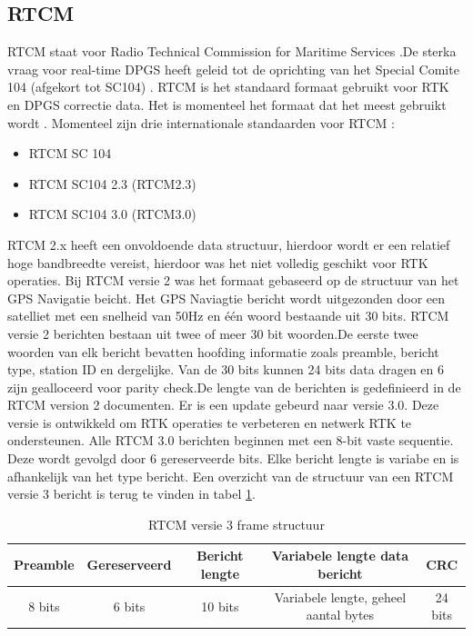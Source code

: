 \subsection{RTCM}
\label{LRTC}
RTCM staat voor Radio Technical Commission for Maritime Services \cite{LBibGLONASS}.De sterka vraag voor real-time DPGS heeft geleid tot de oprichting van het Special Comite 104 (afgekort tot SC104) \cite{LBibRTCM}. RTCM is het standaard formaat gebruikt voor RTK en DPGS correctie data. Het is momenteel het formaat dat het meest gebruikt wordt \cite{LBibRTK3}.
Momenteel zijn drie internationale standaarden voor RTCM \cite{LBibRTCM}:
\begin{itemize}
	\item RTCM SC 104
	\item RTCM SC104 2.3 (RTCM2.3)
	\item RTCM SC104 3.0 (RTCM3.0) 
\end{itemize}
RTCM 2.x heeft een onvoldoende data structuur, hierdoor wordt er een relatief hoge bandbreedte vereist, hierdoor was het niet volledig geschikt voor RTK operaties. Bij RTCM versie 2 was het formaat gebaseerd op de structuur van het GPS Navigatie beicht. Het GPS Naviagtie bericht wordt uitgezonden door een satelliet met een snelheid van 50Hz en \'e\'en woord bestaande uit 30 bits. RTCM versie 2 berichten bestaan uit twee of meer 30 bit woorden.De eerste twee woorden van elk bericht bevatten hoofding informatie zoals preamble, bericht type, station ID en dergelijke. Van de 30 bits kunnen 24 bits data dragen en 6 zijn gealloceerd voor parity check.De lengte van de berichten is gedefinieerd in de RTCM version 2 documenten. Er is een update gebeurd naar versie 3.0. Deze versie is ontwikkeld om RTK operaties te verbeteren en netwerk RTK te ondersteunen. Alle RTCM 3.0 berichten beginnen met een 8-bit vaste sequentie. Deze wordt gevolgd door 6 gereserveerde bits. Elke bericht lengte is variabe en is afhankelijk van het type bericht. Een overzicht van de structuur van een RTCM versie 3 bericht is terug te vinden in tabel \ref{TabRTCM}.

\begin{table}[hbp]
	\caption{RTCM versie 3 frame structuur}		
	\begin{tabular}{|c|c|c|c|c|}	
		\hline
		Preamble & Gereserveerd & Bericht lengte & Variabele lengte data bericht & CRC \\ \hline
		8 bits & 6 bits & 10 bits & Variabele lengte, geheel aantal bytes & 24 bits \\ \hline
	\end{tabular}
	\label{TabRTCM}
\end{table}

